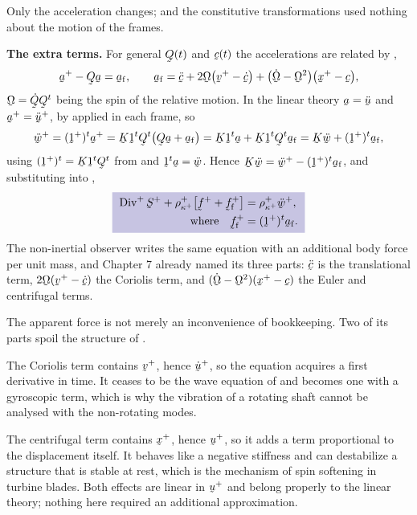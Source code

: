 \begin{solution}
Only the acceleration changes;  and the constitutive
transformations  used nothing about the motion of the
frames.

\textbf{The extra terms.} For general $\bQ(t)$ and $\bc(t)$ the
accelerations are related by ,
\[
   \ba^{+}-\bQ\ba=\ba_{\mathrm{f}},\qquad
   \ba_{\mathrm{f}}=\ddot\bc+2\bOm\big(\bv^{+}-\dot\bc\big)
   +\big(\dot\bOm-\bOm^{2}\big)\big(\bx^{+}-\bc\big),
\]
$\bOm=\dot\bQ\bQ^{t}$ being the spin of the relative motion. In the
linear theory $\ba=\ddot\bu$ and $\ba^{+}=\ddot\bu^{+}$, by
 applied in each frame, so
\[
   \ddot\bw^{+}=(\shift^{+})^{t}\ba^{+}
   =\bK\shift^{t}\bQ^{t}\big(\bQ\ba+\ba_{\mathrm{f}}\big)
   =\bK\shift^{t}\ba+\bK\shift^{t}\bQ^{t}\ba_{\mathrm{f}}
   =\bK\ddot\bw+(\shift^{+})^{t}\ba_{\mathrm{f}} ,
\]
using $(\shift^{+})^{t}=\bK\shift^{t}\bQ^{t}$ from  and
$\shift^{t}\ba=\ddot\bw$. Hence
$\bK\ddot\bw=\ddot\bw^{+}-(\shift^{+})^{t}\ba_{\mathrm{f}}$, and
substituting into ,
\[
   \boxed{\;
\begin{aligned}
   \Dvg^{+}\bS^{+}+\rho^{+}_{\kappa^{+}}
   \big[\bff^{+}+\bff^{+}_{\mathrm{f}}\big]
   &=\rho^{+}_{\kappa^{+}}\ddot\bw^{+},\\
   \text{where}\quad
   \bff^{+}_{\mathrm{f}}&=(\shift^{+})^{t}\ba_{\mathrm{f}} .
\end{aligned}\;}
\]
The non-inertial observer writes the same equation with an additional
body force per unit mass, and Chapter 7 already named its three parts:
$\ddot\bc$ is the translational term, $2\bOm(\bv^{+}-\dot\bc)$ the
Coriolis term, and $(\dot\bOm-\bOm^{2})(\bx^{+}-\bc)$ the Euler and
centrifugal terms.

\begin{remark}\label{rem:ch12coriolis}
The apparent force is not merely an inconvenience of bookkeeping. Two
of its parts spoil the structure of .

The Coriolis term contains $\bv^{+}$, hence $\dot\bu^{+}$, so the
equation acquires a first derivative in time. It ceases to be the wave
equation of  and becomes one with a gyroscopic term, which
is why the vibration of a rotating shaft cannot be analysed with the
non-rotating modes.

The centrifugal term contains $\bx^{+}$, hence $\bu^{+}$, so it adds a
term proportional to the displacement itself. It behaves like a
negative stiffness and can destabilize a structure that is stable at
rest, which is the mechanism of spin softening in turbine blades. Both
effects are linear in $\bu^{+}$ and belong properly to the linear
theory; nothing here required an additional approximation.
\end{remark}
\end{solution}

